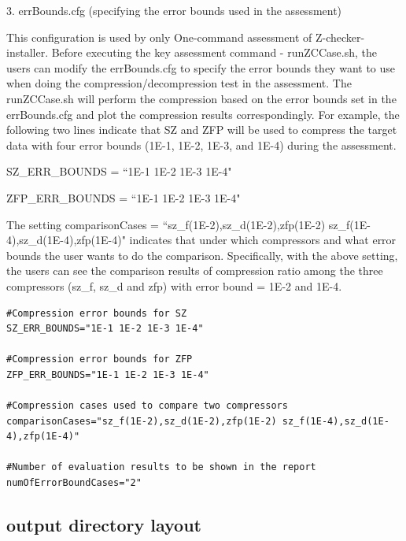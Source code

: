 3. errBounds.cfg (specifying the error bounds used in the assessment)

This configuration is used by only One-command assessment of Z-checker-installer. Before executing the key assessment command - runZCCase.sh, the users can modify the errBounds.cfg to specify the error bounds they want to use when doing the compression/decompression test in the assessment. The runZCCase.sh will perform the compression based on the error bounds set in the errBounds.cfg and plot the compression results correspondingly.
For example, the following two lines indicate that SZ and ZFP will be used to compress the target data with four error bounds (1E-1, 1E-2, 1E-3, and 1E-4) during the assessment. 
 
SZ\_ERR\_BOUNDS = ``1E-1 1E-2 1E-3 1E-4"

ZFP\_ERR\_BOUNDS = ``1E-1 1E-2 1E-3 1E-4"

The setting comparisonCases = ``sz\_f(1E-2),sz\_d(1E-2),zfp(1E-2) sz\_f(1E-4),sz\_d(1E-4),zfp(1E-4)"  indicates that under which compressors and what error bounds the user wants to do the comparison. 
Specifically, with the above setting, the users can see the comparison results of compression ratio among the three compressors (sz\_f, sz\_d and zfp) with error bound = 1E-2 and 1E-4. 

\begin{lstlisting}[style=ShellStyleInline, basicstyle =\footnotesize\ttfamily]
#Compression error bounds for SZ
SZ_ERR_BOUNDS="1E-1 1E-2 1E-3 1E-4"

#Compression error bounds for ZFP
ZFP_ERR_BOUNDS="1E-1 1E-2 1E-3 1E-4"

#Compression cases used to compare two compressors
comparisonCases="sz_f(1E-2),sz_d(1E-2),zfp(1E-2) sz_f(1E-4),sz_d(1E-4),zfp(1E-4)"

#Number of evaluation results to be shown in the report
numOfErrorBoundCases="2"
\end{lstlisting}

\subsection{output directory layout}

